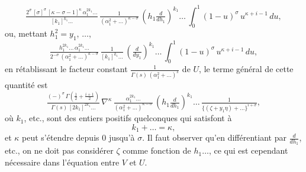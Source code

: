 \documentclass[12pt,a4paper]{article}
\begin{document}
\[
\tfrac{2^{\sigma}\,[\sigma]^{\sigma}\,[\kappa - \sigma - 1]^{\kappa}\,\alpha_1^{2k_1}\ldots}{[k_1]^{k_1}\ldots}\,\tfrac{1}{(\alpha_1^2 + \ldots)^{\kappa - \sigma}}\,\left(h_1\tfrac{d}{dh_1}\right)^{k_1}\ldots\,\int_0^1 (1 - u)^{\sigma}\,u^{\kappa + i - 1}\,du,
\]
ou, mettant $h_1^2 = y_1$, $\ldots$,
\[
\tfrac{h_1^{2k_1}\ldots\,\alpha_1^{2k_1}\ldots}{2^{-\sigma}\,(\alpha_1^2 + \ldots)^{\kappa - \sigma}}\,\tfrac{1}{[k_1]^{k_1}\ldots}\,\left(\tfrac{d}{dy_1}\right)^{k_1}\ldots\,\int_0^1 (1 - u)^{\sigma}\,u^{\kappa + i - 1}\,du,
\]
en r\'etablissant le facteur constant $\tfrac{1}{\Gamma(s)\,(\alpha_1^2 + \ldots)^s}$ de $U$, le terme g\'en\'eral de cette quantit\'e est
\[
\tfrac{(-)^{\sigma}\,\Gamma(\tfrac12 + \tfrac{i + 1}{2})}{\Gamma(s)\,[2k_1]^{2k_1}\ldots}\,\nabla^{\kappa}\,\tfrac{\alpha_1^{2k_1}\ldots}{(\alpha_1^2 + \ldots)^{\kappa - \sigma}}\,\left(h_1\tfrac{d}{dh_1}\right)^{k_1}\ldots\,\tfrac{1}{\{(\zeta + y_1\eta) + \ldots\}^{i + \sigma}},
\]
o\`u $k_1$, etc., sont des entiers positifs quelconques qui satisfont \`a
\[
k_1 + \ldots = \kappa,
\]
et $\kappa$ peut s'\'etendre depuis $0$ jusqu'\`a $\sigma$. Il faut observer qu'en diff\'erentiant par $\tfrac{d}{dh_1}$, etc., on ne doit pas consid\'erer $\zeta$ comme fonction de $h_1\ldots$, ce qui est cependant n\'ecessaire dans l'\'equation entre $V$ et $U$.
\end{document}
